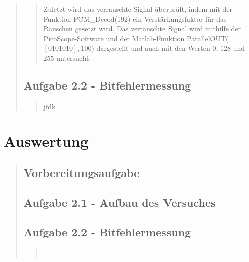 \begin{quote}
\begin{quote}
        Zuletzt wird das verrauschte Signal überprüft, indem mit der Funktion
        PCM\_Decod(192) ein Verstärkungsfaktor für das Rauschen gesetzt wird.
        Das verrauschte Signal wird mithilfe der PicoScope-Software und der
        Matlab-Funktion ParallelOUT($[0 1 0 1 0 1 0],100$) dargestellt und auch
        mit den Werten $0$, $128$ und $255$ untersucht.
        
        
    \end{quote}%
    
    \subsection{Aufgabe 2.2 - Bitfehlermessung}
    \begin{quote}
    
        jfdk
    
    \end{quote}%

\end{quote}%


    
\section{Auswertung}
\begin{quote}
    
    \subsection{Vorbereitungsaufgabe}
    \begin{quote}
        
    \end{quote}  %
    
    \subsection{Aufgabe 2.1 - Aufbau des Versuches}
    \begin{quote}
        
    \end{quote}  %
    
    \subsection{Aufgabe 2.2 - Bitfehlermessung}
    \begin{quote}
         \\
    \end{quote}  %
            
\end{quote}%

